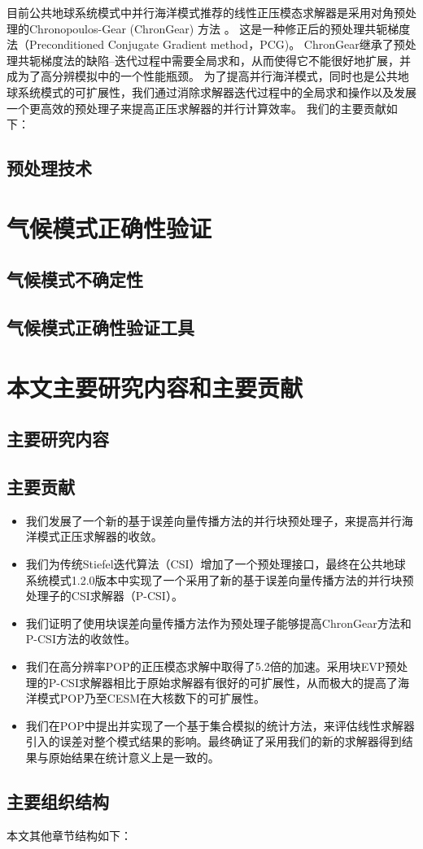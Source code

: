 目前公共地球系统模式中并行海洋模式推荐的线性正压模态求解器是采用对角预处理的Chronopoulos-Gear (ChronGear) 方法
\cite{dAzevedo1999lapack}。 这是一种修正后的预处理共轭梯度法（Preconditioned Conjugate
Gradient method，PCG)。 
ChronGear继承了预处理共轭梯度法的缺陷--迭代过程中需要全局求和，从而使得它不能很好地扩展，并成为了高分辨模拟中的一个性能瓶颈。
为了提高并行海洋模式，同时也是公共地球系统模式的可扩展性，我们通过消除求解器迭代过程中的全局求和操作以及发展一个更高效的预处理子来提高正压求解器的并行计算效率。
我们的主要贡献如下： 
\subsection{预处理技术}

\section{气候模式正确性验证}
\subsection{气候模式不确定性}
\subsection{气候模式正确性验证工具}


\section{本文主要研究内容和主要贡献}
\subsection{主要研究内容}
\subsection{主要贡献}
\begin{itemize}
\item  
我们发展了一个新的基于误差向量传播方法的并行块预处理子\cite{roache1995elliptic}，来提高并行海洋模式正压求解器的收敛。 
\item  
我们为传统Stiefel迭代算法（CSI）\cite{hu2013scalable}增加了一个预处理接口，最终在公共地球系统模式1.2.0版本中实现了一个采用了新的基于误差向量传播方法的并行块预处理子的CSI求解器（P-CSI）。
\item  
我们证明了使用块误差向量传播方法作为预处理子能够提高ChronGear方法和P-CSI方法的收敛性。 
\item  
我们在高分辨率POP的正压模态求解中取得了5.2倍的加速。采用块EVP预处理的P-CSI求解器相比于原始求解器有很好的可扩展性，从而极大的提高了海洋模式POP乃至CESM在大核数下的可扩展性。 
\item  
我们在POP中提出并实现了一个基于集合模拟的统计方法，来评估线性求解器引入的误差对整个模式结果的影响。最终确证了采用我们的新的求解器得到结果与原始结果在统计意义上是一致的。 
\end{itemize}
\subsection{主要组织结构}
本文其他章节结构如下：


